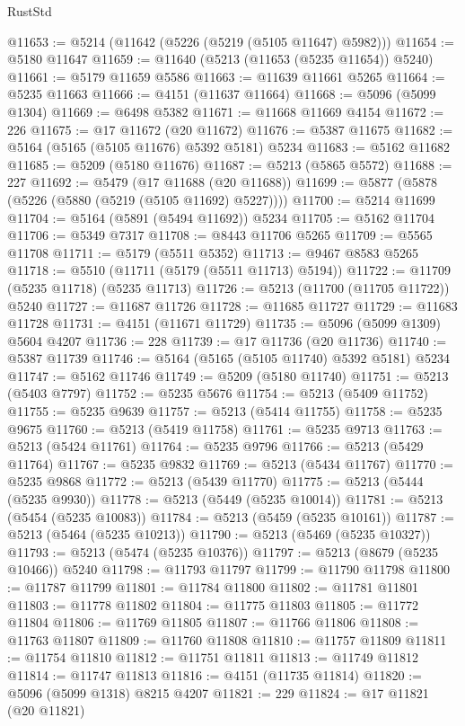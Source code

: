 \begin{lexlean}{RustStd}
\begin{coremodule}
@11653 := @5214 (@11642 (@5226 (@5219 (@5105 @11647) @5982)))
@11654 := @5180 @11647
@11659 := @11640 (@5213 (@11653 (@5235 @11654)) @5240)
@11661 := @5179 @11659 @5586
@11663 := @11639 @11661 @5265
@11664 := @5235 @11663
@11666 := @4151 (@11637 @11664)
@11668 := @5096 (@5099 @1304)
@11669 := @6498 @5382
@11671 := @11668 @11669 @4154
@11672 := 226
@11675 := @17 @11672 (@20 @11672)
@11676 := @5387 @11675
@11682 := @5164 (@5165 (@5105 @11676) @5392 @5181) @5234
@11683 := @5162 @11682
@11685 := @5209 (@5180 @11676)
@11687 := @5213 (@5865 @5572)
@11688 := 227
@11692 := @5479 (@17 @11688 (@20 @11688))
@11699 := @5877 (@5878 (@5226 (@5880 (@5219 (@5105 @11692) @5227))))
@11700 := @5214 @11699
@11704 := @5164 (@5891 (@5494 @11692)) @5234
@11705 := @5162 @11704
@11706 := @5349 @7317
@11708 := @8443 @11706 @5265
@11709 := @5565 @11708
@11711 := @5179 (@5511 @5352)
@11713 := @9467 @8583 @5265
@11718 := @5510 (@11711 (@5179 (@5511 @11713) @5194))
@11722 := @11709 (@5235 @11718) (@5235 @11713)
@11726 := @5213 (@11700 (@11705 @11722)) @5240
@11727 := @11687 @11726
@11728 := @11685 @11727
@11729 := @11683 @11728
@11731 := @4151 (@11671 @11729)
@11735 := @5096 (@5099 @1309) @5604 @4207
@11736 := 228
@11739 := @17 @11736 (@20 @11736)
@11740 := @5387 @11739
@11746 := @5164 (@5165 (@5105 @11740) @5392 @5181) @5234
@11747 := @5162 @11746
@11749 := @5209 (@5180 @11740)
@11751 := @5213 (@5403 @7797)
@11752 := @5235 @5676
@11754 := @5213 (@5409 @11752)
@11755 := @5235 @9639
@11757 := @5213 (@5414 @11755)
@11758 := @5235 @9675
@11760 := @5213 (@5419 @11758)
@11761 := @5235 @9713
@11763 := @5213 (@5424 @11761)
@11764 := @5235 @9796
@11766 := @5213 (@5429 @11764)
@11767 := @5235 @9832
@11769 := @5213 (@5434 @11767)
@11770 := @5235 @9868
@11772 := @5213 (@5439 @11770)
@11775 := @5213 (@5444 (@5235 @9930))
@11778 := @5213 (@5449 (@5235 @10014))
@11781 := @5213 (@5454 (@5235 @10083))
@11784 := @5213 (@5459 (@5235 @10161))
@11787 := @5213 (@5464 (@5235 @10213))
@11790 := @5213 (@5469 (@5235 @10327))
@11793 := @5213 (@5474 (@5235 @10376))
@11797 := @5213 (@8679 (@5235 @10466)) @5240
@11798 := @11793 @11797
@11799 := @11790 @11798
@11800 := @11787 @11799
@11801 := @11784 @11800
@11802 := @11781 @11801
@11803 := @11778 @11802
@11804 := @11775 @11803
@11805 := @11772 @11804
@11806 := @11769 @11805
@11807 := @11766 @11806
@11808 := @11763 @11807
@11809 := @11760 @11808
@11810 := @11757 @11809
@11811 := @11754 @11810
@11812 := @11751 @11811
@11813 := @11749 @11812
@11814 := @11747 @11813
@11816 := @4151 (@11735 @11814)
@11820 := @5096 (@5099 @1318) @8215 @4207
@11821 := 229
@11824 := @17 @11821 (@20 @11821)

\end{coremodule}
\end{lexlean}
